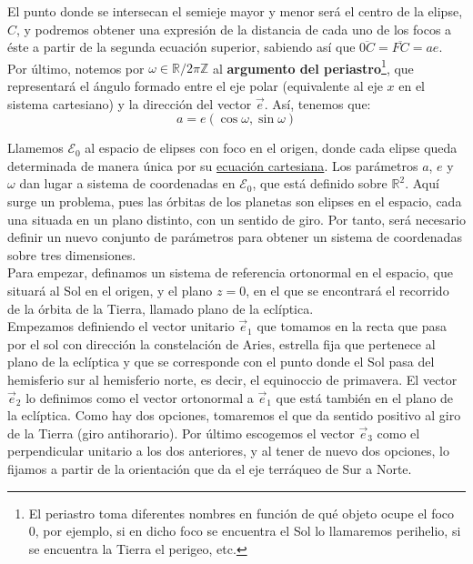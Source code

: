 \documentclass[11pt]{article}
\begin{document}
El punto donde se intersecan el semieje mayor y menor será el centro de la elipse, $C$, y podremos obtener una expresión de la distancia de cada uno de los focos a éste a partir de la segunda ecuación superior, sabiendo así que $\overline{0C}=\overline{FC}=ae$.\\

Por último, notemos por $\omega\in\mathbb{R}/2\pi\mathbb{Z}$ al \textbf{argumento del periastro}\footnote{El periastro toma diferentes nombres en función de qué objeto ocupe el foco 0, por ejemplo, si en dicho foco se encuentra el Sol lo llamaremos perihelio, si se encuentra la Tierra el perigeo, etc.}, que representará el ángulo formado entre el eje polar (equivalente al eje $x$ en el sistema cartesiano) y la dirección del vector $\vec{e}$. Así, tenemos que:
\[
a=e(\cos{\omega},\sin{\omega})
\]

Llamemos $\mathcal{E}_0$ al espacio de elipses con foco en el origen, donde cada elipse queda determinada de manera única por su \hyperref[eq:elipse_cartesiana]{ecuación cartesiana}. Los parámetros $a$, $e$ y $\omega$ dan lugar a sistema de coordenadas en $\mathcal{E}_0$, que está definido sobre $\mathbb{R}^2$. Aquí surge un problema, pues las órbitas de los planetas son elipses en el espacio, cada una situada en un plano distinto, con un sentido de giro. Por tanto, será necesario definir un nuevo conjunto de parámetros para obtener un sistema de coordenadas sobre tres dimensiones.\\

Para empezar, definamos un sistema de referencia ortonormal en el espacio, que situará al Sol en el origen, y el plano $z=0$, en el que se encontrará el recorrido de la órbita de la Tierra, llamado plano de la eclíptica.\\

Empezamos definiendo el vector unitario $\vec{e}_1$ que tomamos en la recta que pasa por el sol con dirección la constelación de Aries, estrella fija que pertenece al plano de la eclíptica y que se corresponde con el punto donde el Sol pasa del hemisferio sur al hemisferio norte, es decir, el equinoccio de primavera. El vector $\vec{e}_2$ lo definimos como el vector ortonormal a $\vec{e}_1$ que está también en el plano de la eclíptica. Como hay dos opciones, tomaremos el que da sentido positivo al giro de la Tierra (giro antihorario). Por último escogemos el vector $\vec{e}_3$ como el perpendicular unitario a los dos anteriores, y al tener de nuevo dos opciones, lo fijamos a partir de la orientación que da el eje terráqueo de Sur a Norte.\\
\end{document}
